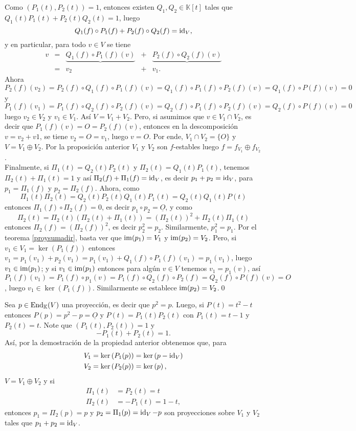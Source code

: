 \dem Como $\left(P_1(t),P_2(t)\right)=1$, entonces existen $Q_1,Q_2\in \mathbb{K}[t]$ tales que $Q_1(t)P_1(t)+P_2(t)Q_2(t)=1$, luego
\[
Q_1(f)\circ P_1(f)+P_2(f)\circ Q_2(f)=\operatorname{id}_V,
\]
y en particular, para todo $v\in V$ se tiene
\[
\begin{array}{rcccc}
v & = & \underbrace{Q_1(f)\circ P_1(f)(v)} & + & \underbrace{P_2(f)\circ Q_2(f)(v)}\\
  & = & v_2 & + & v_1.
\end{array}
\]
Ahora
\[
P_2(f)(v_2)=P_2(f)\circ Q_1(f)\circ P_1(f)(v)=Q_1(f)\circ P_1(f)\circ P_2(f) (v)=Q_1(f)\circ P(f)(v)=0
\]
y
\[
P_1(f)(v_1)=P_1(f)\circ Q_2(f)\circ P_2(f)(v)=Q_2(f)\circ P_1(f)\circ P_2(f) (v)=Q_2(f)\circ P(f)(v)=0
\]
luego $v_2\in V_2$ y $v_1\in V_1$. As\'i $V=V_1+V_2$. Pero, si asumimos que $v\in V_1\cap V_2$, es decir que $P_1(f)(v)=O=P_2(f)(v)$, entonces en la descomposición $v=v_2+v1$, se tiene $v_2=O=v_1$, luego $v=O$. Por ende, $V_1\cap V_2=\{O\}$ y $V=V_1\oplus V_2$. Por la proposición anterior $V_1$ y $V_2$ son $f$-estables luego $f=f_{V_1}\oplus f_{V_2}$.\\
Finalmente, si $\Pi_1(t)=Q_2(t)P_2(t)$ y $\Pi_2(t)=Q_1(t)P_1(t)$, tenemos $\Pi_2(t)+\Pi_1(t)=1$ y así
$\Pi_2(f)+\Pi_1(f)=\operatorname{id}_V$, es decir $p_1+p_2=\operatorname{id}_V$, para $p_1=\Pi_1(f)$ y $p_2=\Pi_2(f)$. Ahora, como
\[
\Pi_1(t)\Pi_2(t)=Q_2(t)P_2(t)Q_1(t)P_1(t)=Q_2(t)Q_1(t)P(t)
\]
entonces $\Pi_1(f)\circ\Pi_2(f)=0$, es decir $p_1\circ p_2=\underline{O}$, y como
\[
\Pi_2(t)=\Pi_2(t)\left(\Pi_2(t)+\Pi_1(t)\right)=\left(\Pi_2(t)\right)^2+\Pi_2(t)\Pi_1(t)
\]
entonces $\Pi_2(f)=\left(\Pi_2(f)\right)^2$, es decir $p_2^2=p_2$. Similarmente, $p_1^2=p_1$. Por el teorema \ref{proysumadir}, basta ver que $\operatorname{im}(p_1)=V_1$ y $\operatorname{im}(p_2)=V_2$. Pero, si $v_1\in V_1=\ker(P_1(f))$ entonces $v_1=p_1(v_1)+p_2(v_1)=p_1(v_1)+Q_1(f)\circ P_1(f)(v_1)=p_1(v_1)$, luego $v_1\in\operatorname{im}(p_1)$; y si $v_1\in\operatorname{im}(p_1)$ entonces para algún $v\in V$ tenemos $v_1=p_1(v)$, así $P_1(f)(v_1)=P_1(f)\circ p_1(v)=P_1(f)\circ Q_2(f)\circ P_2(f)=Q_2(f)\circ P(f)(v)=O$, luego $v_1\in\ker(P_1(f))$. Similarmente se establece $\operatorname{im}(p_2)=V_2$.\qed

\begin{ejem}
Sea $p\in\operatorname{End}_\mathbb{K}(V)$ una proyecci\'on, es decir que $p^2=p$. Luego, si $P(t)=t^2-t$ entonces $P(p)=p^2-p=\underline{O}$ y $P(t)=P_1(t)P_2(t)$ con $P_1(t)=t-1$ y $P_2(t)=t$. Note que $\left(P_1(t),P_2(t)\right)=1$ y $$-P_1(t)+P_2(t)=1.$$
As\'i, por la demostraci\'on de la propiedad anterior obtenemos que, para
\begin{align*}
V_1 & =\ker\left(P_1(p)\right)=\ker\left(p-\operatorname{id}_V\right)\\
V_2 & =\ker\left(P_2(p)\right)=\ker\left(p\right),
\end{align*}
$V=V_1\oplus V_2$ y si
\begin{align*}
\Pi_1(t) & =P_2(t)=t\\
\Pi_2(t) & =-P_1(t)=1-t,
\end{align*}
entonces $p_1=\Pi_2(p)=p$ y $p_2=\Pi_1(p)=\operatorname{id}_V-p$ son proyecciones sobre $V_1$ y $V_2$ tales que $p_1+p_2=\operatorname{id}_V$.
\end{ejem}


